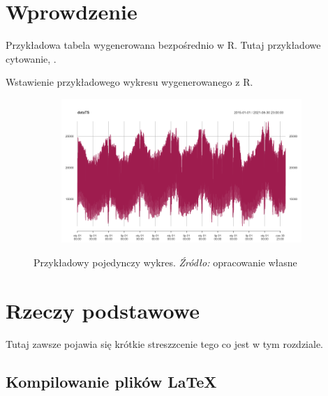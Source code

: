 \documentclass[polish, twoside, 12pt, a4paper]{article}
\theoremstyle{definition}
\theoremstyle{plain}
\theoremstyle{remark}
\begin{document}
\section{Wprowdzenie}

Przykładowa tabela wygenerowana bezpośrednio w R. Tutaj przykładowe cytowanie, \citep{bahmanyar2020impact}.



Wstawienie przykładowego wykresu wygenerowanego z R. 

\begin{figure}[hbt]
  \centering

  \begin{subfigure}[t]{0.45\textwidth}
    \includegraphics[width=\textwidth]{./out_figures/fig1.png}
  \end{subfigure}

  \captionsetup{margin=10pt,font=small,labelfont=bf,width=.8\textwidth}

  \caption[Przykładowy wykres]{Przykładowy pojedynczy wykres. \textit{Źródło:} opracowanie własne}\label{fig:przykladowy-wykres}
\end{figure}

\clearpage
\section{Rzeczy podstawowe}

Tutaj zawsze pojawia się krótkie streszzcenie tego co jest w tym rozdziale.

\subsection{Kompilowanie plików \LaTeX}
\end{document}

